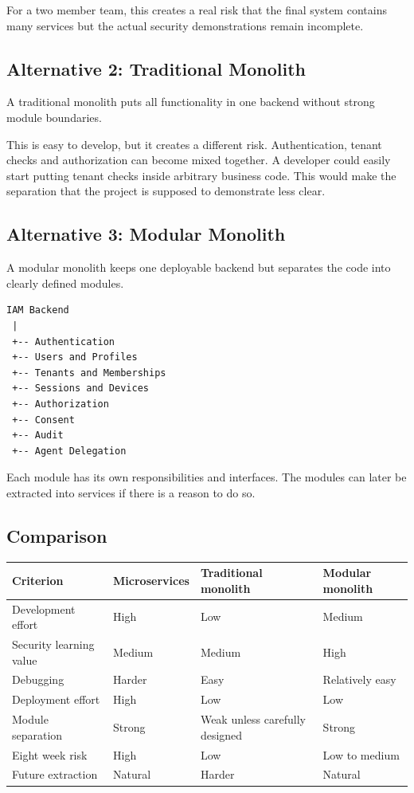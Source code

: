 \documentclass[11pt,a4paper]{article}
\begin{document}
For a two member team, this creates a real risk that the final system contains many services but the actual security demonstrations remain incomplete.

\subsection{Alternative 2: Traditional Monolith}

A traditional monolith puts all functionality in one backend without strong module boundaries.

This is easy to develop, but it creates a different risk. Authentication, tenant checks and authorization can become mixed together. A developer could easily start putting tenant checks inside arbitrary business code. This would make the separation that the project is supposed to demonstrate less clear.

\subsection{Alternative 3: Modular Monolith}

A modular monolith keeps one deployable backend but separates the code into clearly defined modules.

\begin{verbatim}
IAM Backend
 |
 +-- Authentication
 +-- Users and Profiles
 +-- Tenants and Memberships
 +-- Sessions and Devices
 +-- Authorization
 +-- Consent
 +-- Audit
 +-- Agent Delegation
\end{verbatim}

Each module has its own responsibilities and interfaces. The modules can later be extracted into services if there is a reason to do so.

\subsection{Comparison}

\begin{longtable}{p{}p{}p{}p{}}
\toprule
Criterion & Microservices & Traditional monolith & Modular monolith \\
\midrule
Development effort & High & Low & Medium \\
Security learning value & Medium & Medium & High \\
Debugging & Harder & Easy & Relatively easy \\
Deployment effort & High & Low & Low \\
Module separation & Strong & Weak unless carefully designed & Strong \\
Eight week risk & High & Low & Low to medium \\
Future extraction & Natural & Harder & Natural \\
\bottomrule
\end{longtable}
\end{document}
